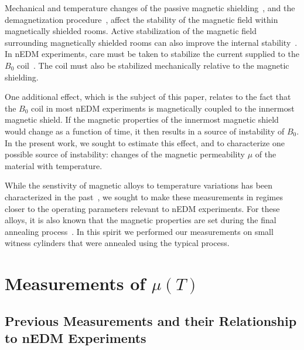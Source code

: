 \documentclass[review]{elsarticle}
\begin{document}
Mechanical and temperature changes of the passive magnetic
shielding~\cite{bib:voigt,bib:thiel}, and the demagnetization
procedure~\cite{bib:thiel,bib:fierlinger2016}, affect the stability of
the magnetic field within magnetically shielded rooms.  Active
stabilization of the magnetic field surrounding magnetically shielded
rooms can also improve the internal
stability~\cite{bib:franke,bib:voigt,bib:afach}.  In nEDM experiments,
care must be taken to stabilize the current supplied to the $B_0$
coil~\cite{bib:brys}. The coil must also be stabilized mechanically
relative to the magnetic shielding.

One additional effect, which is the subject of this paper, relates to
the fact that the $B_0$ coil in most nEDM experiments is magnetically
coupled to the innermost magnetic shield.  If the magnetic properties
of the innermost magnetic shield would change as a function of time,
it then results in a source of instability of $B_0$.  In the present
work, we sought to estimate this effect, and to characterize one
possible source of instability: changes of the magnetic permeability
$\mu$ of the material with temperature.

While the senstivity of magnetic alloys to temperature variations has
been characterized in the past~\cite{bib:couderchon,bib:kruppvdm}, we
sought to make these measurements in regimes closer to the operating
parameters relevant to nEDM experiments.  For these alloys, it is also
known that the magnetic properties are set during the final annealing
process~\cite{bib:gupta,bib:bozorth,bib:kruppvdm}.  In this spirit we
performed our measurements on small witness cylinders that were
annealed using the typical process.








\section{Measurements of $\mu(T)$\label{sec:tdep}}

\subsection{Previous Measurements and their Relationship to nEDM Experiments\label{sec:previousmeasurement}}
\end{document}
